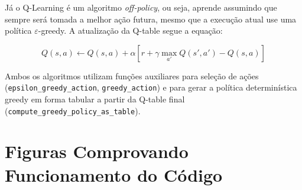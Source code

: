 \documentclass[a4paper,12pt]{article}
\begin{document}
Já o Q-Learning é um algoritmo \textit{off-policy}, ou seja, aprende assumindo que sempre será tomada a melhor ação futura, mesmo que a execução atual use uma política $\varepsilon$-greedy. A atualização da Q-table segue a equação:

\[
Q(s, a) \leftarrow Q(s, a) + \alpha \left[ r + \gamma \max_{a'} Q(s', a') - Q(s, a) \right]
\]

Ambos os algoritmos utilizam funções auxiliares para seleção de ações (\texttt{epsilon\_greedy\_action}, \texttt{greedy\_action}) e para gerar a política determinística greedy em forma tabular a partir da Q-table final (\texttt{compute\_greedy\_policy\_as\_table}).

\newpage
\section{Figuras Comprovando Funcionamento do Código}
\end{document}
